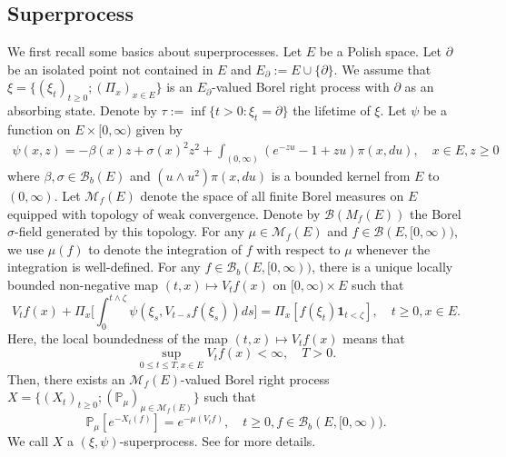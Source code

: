 \documentclass[12pt,a4paper]{amsart}
\numberwithin{equation}{section}
\theoremstyle{plain}
\theoremstyle{definition}
\theoremstyle{remark}
\begin{document}
\subsection{Superprocess}\label{model}
	We first recall some basics about superprocesses. %
	Let $E$ be a Polish space. %
	Let $\partial$ be an isolated point not contained in $E$ and $E_\partial := E \cup \{\partial\}$. %
	We assume that  $\xi= \{(\xi_t)_{t\ge0}; (\Pi_x)_{x\in E}\}$ is an $E_\partial$-valued Borel right process with $\partial$ as an absorbing state. Denote by $\tau:=\inf\{t>0: \xi_t=\partial\}$ the lifetime of $\xi$. %
	Let $\psi$ be a function on $E \times [0,\infty)$ given by
\begin{align}
	\psi(x,z)
	= -\beta(x) z + \sigma(x)^2 z^2 + \int_{(0,\infty)} (e^{-zu} -1 + zu) \pi(x,du),
	\quad x\in E, z\geq 0
\end{align}
	where $\beta, \sigma \in \mathcal B_b(E)$ and $(u \wedge u^2) \pi(x,du)$ is a bounded kernel from $E$ to $(0,\infty)$.
	Let $\mathcal M_f(E)$ denote the space of all finite Borel measures on $E$ equipped with topology of weak convergence.
	Denote by $\mathcal B(M_f(E))$ the Borel $\sigma$-field generated by this topology. For any $\mu \in \mathcal M_f(E)$ and $f\in \mathcal B(E,[0,\infty))$, we use $\mu(f)$ to denote the integration of $f$ with respect to $\mu$ whenever the integration is well-defined. %
	For any $f \in \mathcal B_b(E,[0,\infty))$, there is a unique locally bounded non-negative map $(t,x)\mapsto V_tf(x)$ on $[0,\infty)\times E$ such that %
\begin{equation} \label{eq: 1}
	V_tf(x) + \Pi_x\Big[\int_0^{t\wedge \zeta} \psi(\xi_s, V_{t-s} f(\xi_s)) ds\Big] = \Pi_x[f(\xi_t) \mathbf 1_{t< \zeta}], \quad t\geq 0, x\in E. %
\end{equation}
	Here, the local boundedness of the map $(t,x) \mapsto V_tf(x)$ means that \[ \sup_{0\leq t\leq T, x\in E} V_tf(x) < \infty, \quad T>0.\] %
	Then, there exists an $\mathcal M_f(E)$-valued Borel right process $X =\{(X_t)_{t\geq 0}; (\mathbb P_\mu)_{\mu \in \mathcal M_f(E)}\}$ such that
\begin{equation}
	\mathbb P_\mu[e^{- X_t(f)}]
	= e^{- \mu(V_tf)},
	\quad t\geq 0, f \in \mathcal B_b(E,[0,\infty)).
\end{equation}
	We call $X$ a $(\xi, \psi)$-superprocess.  See \cite{Li2011MeasureValued} for more details.
\end{document}
